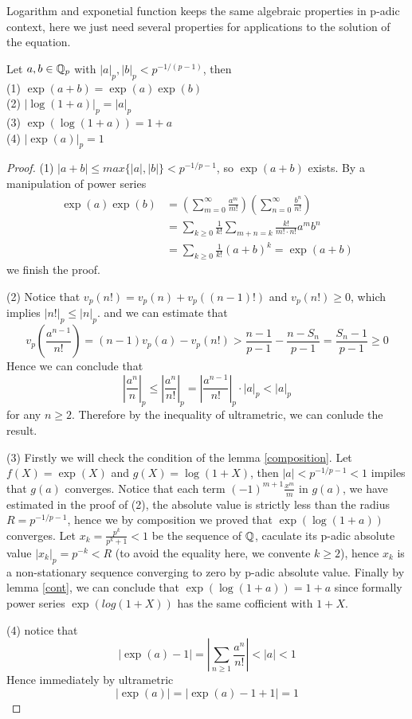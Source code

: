 Logarithm and exponetial function keeps the same algebraic properties in p-adic context, here we just need several properties for applications to the solution of the equation.
\begin{proposition}
    Let \(a,b \in \mathbb{Q}_p\) with \(|a|_p, |b|_p < p^{-1/(p-1)} \), then\\
    (1) \(\exp (a+b)  = \exp (a) \exp(b)\) \\
    (2) \(|\log(1+a)|_p = |a|_p\)\\
    (3) \(\exp (\log (1+a)) = 1+a\)\\
    (4) \(|\exp(a)|_p = 1\)
    \begin{proof}
        (1) \(|a+b|\leq max \{|a|,|b|\}<p^{-1/p-1}\), so \(\exp(a+b)\) exists. By a manipulation of power series
        \begin{align*}
           \exp(a)\exp(b) &= (\sum_{m=0}^{\infty}\frac{a^m}{m!})(\sum_{n=0}^{\infty}\frac{b^n}{n!}) \\
           &= \sum_{k\geq 0}\frac{1}{k!}\sum_{m+n=k}\frac{k!}{m!\cdot n!}a^mb^n\\
           &= \sum_{k\geq 0}\frac{1}{k!}(a+b)^k = \exp(a+b)
        \end{align*}
        we finish the proof.

        (2) Notice that \(v_p(n!)=v_p(n)+v_p((n-1)!)\) and \(v_p(n!)\geq 0\), which implies \(|n!|_p \leq |n|_p\). and we can estimate that
        \[v_p(\frac{a^{n-1}}{n!}) = (n-1)v_p(a)-v_p(n!) > \frac{n-1}{p-1} - \frac{n-S_n}{p-1} = \frac{S_n-1}{p-1} \geq 0\]
        Hence we can conclude that 
        \[|\frac{a^n}{n}|_p \leq |\frac{a^n}{n!}|_p = |\frac{a^{n-1}}{n!}|_p \cdot|a|_p < |a|_p\]        
        for any \(n \geq 2\). Therefore by the inequality of ultrametric, we can conlude the result.

        (3) Firstly we will check the condition of the lemma \ref{composition}. Let \(f(X) = \exp(X)\) and \(g(X) = \log(1+X)\), then \(|a| < p^{-1/p-1} <1\) impiles that \(g(a)\) converges. Notice that each term \((-1)^{m+1}\frac{x^m}{m}\) in \(g(a)\), we have estimated in the proof of (2), the absolute value is strictly less than the radius \(R = p^{-1/p-1}\), hence we by composition we proved that \(\exp(\log(1+a))\) converges. Let \(x_k = \frac{p^k}{p^k+1} <1\) be the sequence of \(\mathbb{Q}\), caculate its p-adic absolute value \(|x_k|_p=p^{-k} < R\) (to avoid the equality here, we convente \(k \geq 2\)), hence \(x_k\) is a non-stationary sequence converging to zero by p-adic absolute value. Finally by lemma \ref{cont}, we can conclude that \( \exp(\log(1+a)) = 1+a\) since formally power series \(\exp(log(1+X))\) has the same cofficient with \(1+X\).

        (4) notice that
        \[|\exp(a)-1| = |\sum_{n \geq 1}\frac{a^n}{n!}| < |a| <1 \]
        Hence immediately by ultrametric
        \[|\exp(a)| = |\exp(a)-1+1| = 1\]
    \end{proof}
\end{proposition}

